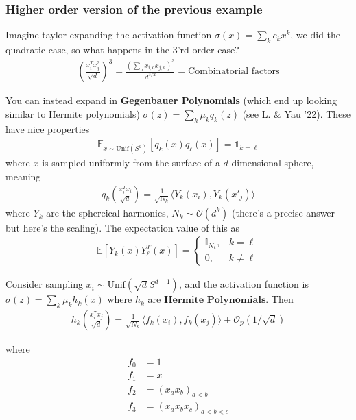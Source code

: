 \subsubsection{Higher order version of the previous example}
Imagine taylor expanding the activation function $\sigma(x) = \sum_k c_k x^k$, we did the quadratic case, so what happens in the 3'rd order case?
\begin{align}
	\left( \frac{x_i^T x_j^3}{\sqrt d}\right) ^3 = \frac{(\sum_a x_{i,a} x_{j,a})^3}{d^{3/2}}  = \text{Combinatorial factors}
\end{align}
\begin{sidework}
	You can instead expand in \textbf{Gegenbauer Polynomials} (which end up looking similar to Hermite polynomials) $\sigma(z) = \sum_k \mu_k q_k(z)$ (see L. \& Yau '22). These have nice properties
\begin{align}
	\mathbb E_{x \sim \text{Unif}(S^d)} [q_k(x) q_\ell (x)] = \mathds 1_{k=\ell}
\end{align}
where $x$ is sampled uniformly from the surface of a $d$ dimensional sphere, meaning 
\begin{align}
	q_k\left( \frac{x_i^T x_i}{\sqrt d}\right) = \frac{1}{\sqrt{N_k}} \langle Y_k (x_i), Y_k(x'_j)\rangle
\end{align}
where $Y_k$ are the sphereical harmonics, $N_k \sim \mathcal O(d^k)$ (there's a precise answer but here's the scaling). The expectation value of this as
\begin{align}
	\mathbb E[Y_k(x) Y^T_\ell(x)] = \begin{cases}
		\mathbb I_{N_k}, & k=\ell\\
		0, & k \neq \ell
	\end{cases}
\end{align}
\end{sidework}


Consider sampling $x_i \sim \text{Unif}(\sqrt{d} S^{d-1})$, and the activation function is $\sigma(z) = \sum_k \mu_k h_k(x)$ where $h_k$ are $\textbf{Hermite Polynomials}$. Then
\begin{align}
	h_k \left( \frac{x_i^T x_j}{\sqrt{d}}\right)  = \frac{1}{\sqrt{N_k}} \langle f_k(x_i) , f_k(x_j)\rangle + \mathcal O_p(1/\sqrt{d})
\end{align}

where
\begin{align}
	f_0 &= 1\\
	f_1 &= x\\
	f_2 &= (x_a x_b)_{a < b}\\
	f_3 &= (x_a x_b x_c)_{a<b<c}
\end{align}

